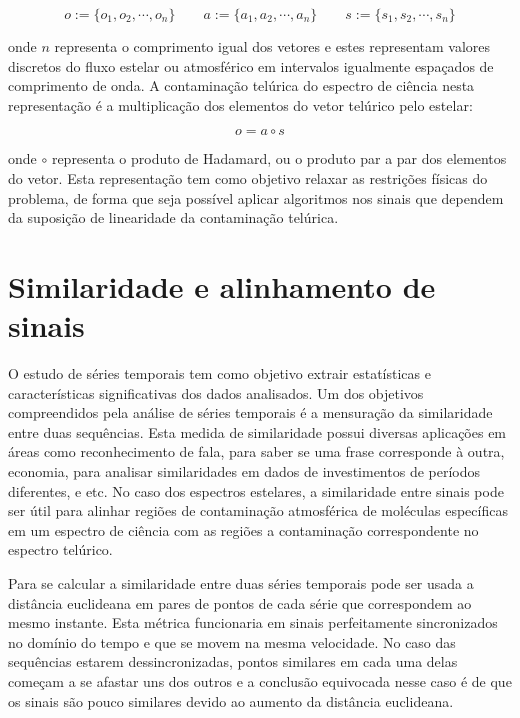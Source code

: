 \begin{equation*}
    o := \{o_1, o_2, \cdots, o_{n}\} \qquad a := \{a_1, a_2, \cdots, a_{n}\} \qquad s := \{s_1, s_2, \cdots, s_{n}\} 
\end{equation*}

\noindent onde $n$ representa o comprimento igual dos vetores e estes representam valores discretos do fluxo estelar ou atmosférico em intervalos igualmente espaçados de comprimento de onda. A contaminação telúrica do espectro de ciência nesta representação é a multiplicação dos elementos do vetor telúrico pelo estelar:

\begin{equation*}
    o = a \circ s
\end{equation*}

\noindent onde $\circ$ representa o produto de Hadamard, ou o produto par a par dos elementos do vetor. Esta representação tem como objetivo relaxar as restrições físicas do problema, de forma que seja possível aplicar algoritmos nos sinais que dependem da suposição de linearidade da contaminação telúrica.


\section{Similaridade e alinhamento de sinais}

O estudo de séries temporais tem como objetivo extrair estatísticas e características significativas dos dados analisados. Um dos objetivos compreendidos pela análise de séries temporais é a mensuração da similaridade entre duas sequências. Esta medida de similaridade possui diversas aplicações em áreas como reconhecimento de fala, para saber se uma frase corresponde à outra, economia, para analisar similaridades em dados de investimentos de períodos diferentes, e etc. No caso dos espectros estelares, a similaridade entre sinais pode ser útil para alinhar regiões de contaminação atmosférica de moléculas específicas em um espectro de ciência com as regiões a contaminação correspondente no espectro telúrico.

Para se calcular a similaridade entre duas séries temporais pode ser usada a distância euclideana em pares de pontos de cada série que correspondem ao mesmo instante. Esta métrica funcionaria em sinais perfeitamente sincronizados no domínio do tempo e que se movem na mesma velocidade. No caso das sequências estarem dessincronizadas, pontos similares em cada uma delas começam a se afastar uns dos outros e a conclusão equivocada nesse caso é de que os sinais são pouco similares devido ao aumento da distância euclideana.

